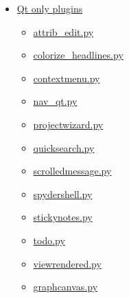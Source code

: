 \documentclass[a4paper,10pt,english]{sphinxmanual}
\begin{document}
{\begin{minipage}{0.95\linewidth}
\begin{itemize}
\begin{itemize}
\begin{itemize}
\begin{itemize}
\item {} 
{\hyperref[plugins:zenity-file-dialogs-py]{zenity\_file\_dialogs.py}}

\end{itemize}

\end{itemize}

\item {} 
{\hyperref[plugins:qt-only-plugins]{Qt only plugins}}
\begin{itemize}
\item {} 
{\hyperref[plugins:attrib-edit-py]{attrib\_edit.py}}

\item {} 
{\hyperref[plugins:colorize-headlines-py]{colorize\_headlines.py}}

\item {} 
{\hyperref[plugins:contextmenu-py]{contextmenu.py}}

\item {} 
{\hyperref[plugins:nav-qt-py]{nav\_qt.py}}

\item {} 
{\hyperref[plugins:projectwizard-py]{projectwizard.py}}

\item {} 
{\hyperref[plugins:quicksearch-py]{quicksearch.py}}

\item {} 
{\hyperref[plugins:scrolledmessage-py]{scrolledmessage.py}}

\item {} 
{\hyperref[plugins:spydershell-py]{spydershell.py}}

\item {} 
{\hyperref[plugins:stickynotes-py]{stickynotes.py}}

\item {} 
{\hyperref[plugins:todo-py]{todo.py}}

\item {} 
{\hyperref[plugins:viewrendered-py]{viewrendered.py}}

\item {} 
{\hyperref[plugins:graphcanvas-py]{graphcanvas.py}}

\end{itemize}

\end{itemize}

\end{itemize}
\end{minipage}}
\begin{center}\setlength{\fboxsep}{5pt}\end{center}
\end{document}
